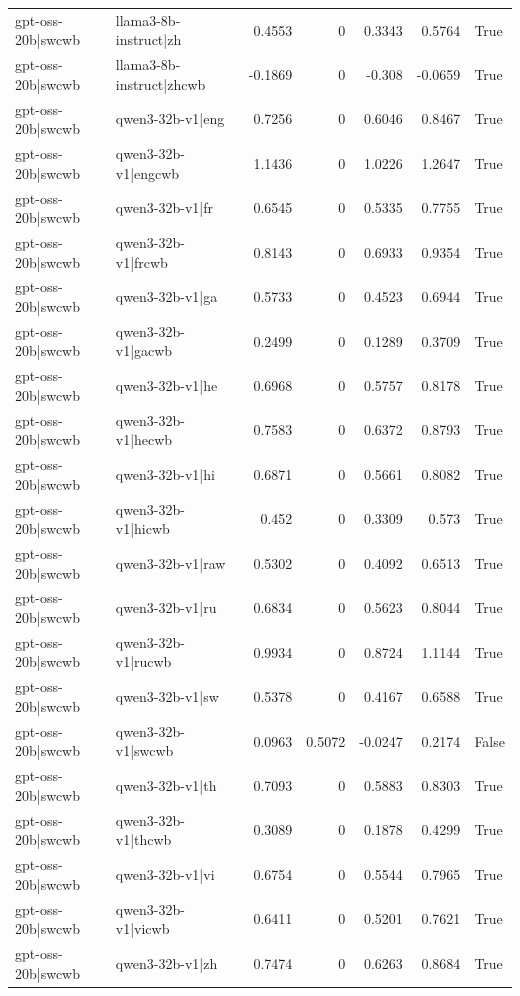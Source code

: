 \begin{table}
\begin{tabular}{l l r r r r l}
gpt-oss-20b|swcwb & llama3-8b-instruct|zh & 0.4553 & 0 & 0.3343 & 0.5764 & True \\
gpt-oss-20b|swcwb & llama3-8b-instruct|zhcwb & -0.1869 & 0 & -0.308 & -0.0659 & True \\
gpt-oss-20b|swcwb & qwen3-32b-v1|eng & 0.7256 & 0 & 0.6046 & 0.8467 & True \\
gpt-oss-20b|swcwb & qwen3-32b-v1|engcwb & 1.1436 & 0 & 1.0226 & 1.2647 & True \\
gpt-oss-20b|swcwb & qwen3-32b-v1|fr & 0.6545 & 0 & 0.5335 & 0.7755 & True \\
gpt-oss-20b|swcwb & qwen3-32b-v1|frcwb & 0.8143 & 0 & 0.6933 & 0.9354 & True \\
gpt-oss-20b|swcwb & qwen3-32b-v1|ga & 0.5733 & 0 & 0.4523 & 0.6944 & True \\
gpt-oss-20b|swcwb & qwen3-32b-v1|gacwb & 0.2499 & 0 & 0.1289 & 0.3709 & True \\
gpt-oss-20b|swcwb & qwen3-32b-v1|he & 0.6968 & 0 & 0.5757 & 0.8178 & True \\
gpt-oss-20b|swcwb & qwen3-32b-v1|hecwb & 0.7583 & 0 & 0.6372 & 0.8793 & True \\
gpt-oss-20b|swcwb & qwen3-32b-v1|hi & 0.6871 & 0 & 0.5661 & 0.8082 & True \\
gpt-oss-20b|swcwb & qwen3-32b-v1|hicwb & 0.452 & 0 & 0.3309 & 0.573 & True \\
gpt-oss-20b|swcwb & qwen3-32b-v1|raw & 0.5302 & 0 & 0.4092 & 0.6513 & True \\
gpt-oss-20b|swcwb & qwen3-32b-v1|ru & 0.6834 & 0 & 0.5623 & 0.8044 & True \\
gpt-oss-20b|swcwb & qwen3-32b-v1|rucwb & 0.9934 & 0 & 0.8724 & 1.1144 & True \\
gpt-oss-20b|swcwb & qwen3-32b-v1|sw & 0.5378 & 0 & 0.4167 & 0.6588 & True \\
gpt-oss-20b|swcwb & qwen3-32b-v1|swcwb & 0.0963 & 0.5072 & -0.0247 & 0.2174 & False \\
gpt-oss-20b|swcwb & qwen3-32b-v1|th & 0.7093 & 0 & 0.5883 & 0.8303 & True \\
gpt-oss-20b|swcwb & qwen3-32b-v1|thcwb & 0.3089 & 0 & 0.1878 & 0.4299 & True \\
gpt-oss-20b|swcwb & qwen3-32b-v1|vi & 0.6754 & 0 & 0.5544 & 0.7965 & True \\
gpt-oss-20b|swcwb & qwen3-32b-v1|vicwb & 0.6411 & 0 & 0.5201 & 0.7621 & True \\
gpt-oss-20b|swcwb & qwen3-32b-v1|zh & 0.7474 & 0 & 0.6263 & 0.8684 & True \\

\end{tabular}
\end{table}
